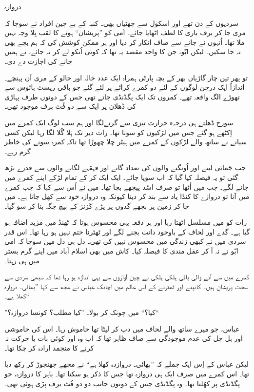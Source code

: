 \documentclass{article}
\begin{document}
\begin{center} \Large
   دروازہ
\end{center}

سردیوں کے دن تھے اور اسکول سے چھٹیاں بھی۔ کنبہ کے بے چین افراد نے سوچا کہ مری جا کر برف باری کا لطف اٹھایا جائے۔ اَمی کو ''پریشان`` ہونے کا لقب بِلا وجہ نہیں ملا تھا۔ اُنہوں نے جانے سے صاف انکار کر دیا اور ہر ممکن کوشش کی کہ ہم بچے بھی نہ جا سکیں۔ لیکن ابّو، جن کا واحد مقصد یہ تھا کہ کوئی اُنکو لے کر نہ جائے، نے ہمیں جانے کی اجازت دے دی۔

تو پھر تین چار گاڑیاں بھر کے بچہ پارٹی ہمراہ ایک عدد خالہ اور خالو کے مری آن پہنچے۔ اندازاً ایک درجن لوگوں کے لئے دو کمرے کرائے پر لئے گئے جو باقی ریسٹ ہائوس سے تھوڑے الگ واقعہ تھے۔ کمروں تک ایک پگڈنڈی جاتے تھی جس کے دونوں طرف پہاڑی کی ڈھلان پر ایک سے دو فُٹ برف موجود تھی۔

سورج ڈھلتے ہی درجہء حرارت تیزی سے گرنےلگا اور ہم سب لوگ ایک کمرے میں اِکٹھے ہو گئے جس میں لڑکیوں کو سونا تھا۔ رات دیر تک ہَلا گُلا لگا رہا لیکن کسی سیانے نے ساتھ والے لڑکوں کے کمرے میں ہیٹر چلا چھوڑا تھا تاکہ کمرہ سونے کی خاطر گرم رہے۔

جب جَمائی لینے اور اُونگنے والوں کی تعداد گانے اور قہقہے لگانے والوں سے قدرے بڑھ گئی تو یہ فیصلہ کیا گیا کہ اب سویا جائے۔ ایک ایک کر کے تمام لڑکے اپنے کمرے میں جانے لگے۔ جب میں اُٹھا تو صرف اسّد پیچھے بچا تھا۔ میں نے اُس سے کہا کہ جب کمرے میں آنا تو دروازے کا کنڈا یاد سے بند کر دینا کیونکہ وہ دروازہ خود سے کھل جاتا ہے۔ میں جا کر زمین پر بچھے گدوں پر پڑے کَزنز کے بیچ جگہ بنا کر سو گیا۔

رات کو میں مسلسل اٹھتا رہا اور ہر دفعہ یہی محسوس ہوتا کہ ٹھنڈ میں مزید اضافہ ہو گیا ہے۔ گدے اور لحاف کے باوجود دانت بجنے لگے اور ٹھٹرنا ختم نہیں ہو رہا تھا۔ اس قدر سردی میں نے کبھی زندگی میں محسوس نہیں کی تھی۔ دل ہی دل میں سوچا کہ امی ابّو نے نہ آ کر عقل مندی کا فیصلہ کیا۔ کاش میں بھی اسلام آباد میں اپنے گرم بستر میں ہی رہتا۔

کمرے میں سے آنے والی باقی ہلکی ہلکی بے چین آوازوں سے یہی اندازہ ہو رہا تھا کہ سبھی سردی سے سخت پریشان ہیں۔ کانپنے اور ٹھٹرنے کے اس عالم میں اچانک عباس نے مجھ سے کہا ''بھائی۔ دروازہ کھلا ہے۔``

''کیا؟`` میں چونک کر بولا۔ ''کیا مطلب؟ کونسا دروازہ؟``

عباس، جو میرے ساتھ والے لحاف میں دب کر لیٹا تھا خاموش رہا۔ اس کی خاموشی اور ہل چل کی عدم موجودگی سے صاف ظاہر تھا کہ اب وہ اور کوئی بات یا حرکت نہ کرنے کا منجمد ارادہ کر چکا تھا۔
 
لیکن عباس کے اِس ایک جملے کہ ''بھائی۔ دروازدہ کھلا ہے`` نے مجھے جھنجوڑ کر رکھ دیا تھا۔ اس کمرے میں صرف ایک ہی دروازہ تھا جس کا ذکر ہو سکتا تھا۔ باہر کا دروازہ، جو پگڈنڈی پر کھُلتا تھا۔ وہ پگڈنڈی جس کے دونوں جانب دو دو فُٹ برف پڑی ہوئی تھی۔
\end{document}
